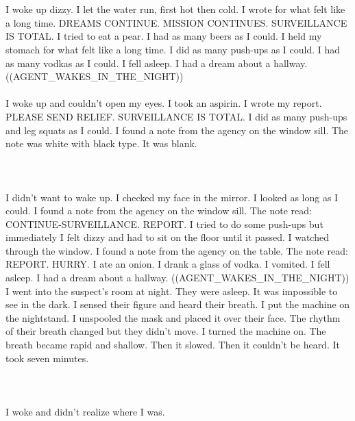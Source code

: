 \documentclass{article}
\begin{document}
    \section{}
    I woke up dizzy. I let the water run, first hot then cold. I wrote for what felt like a long time. DREAMS CONTINUE. MISSION CONTINUES. SURVEILLANCE IS TOTAL. I tried to eat a pear. I had as many beers as I could. I held my stomach for what felt like a long time. I did as many push-ups as I could. I had as many vodkas as I could. I fell asleep. I had a dream about a hallway. ((AGENT_WAKES_IN_THE_NIGHT)) \\\\I woke up and couldn't open my eyes. I took an aspirin. I wrote my report. PLEASE SEND RELIEF. SURVEILLANCE IS TOTAL. I did as many push-ups and leg squats as I could. I found a note from the agency on the window sill. The note was white with black type. It was blank. \\\\
    \newpage
    
    \section{}
    I didn't want to wake up. I checked my face in the mirror. I looked as long as I could. I found a note from the agency on the window sill. The note read: CONTINUE-SURVEILLANCE. REPORT. I tried to do some push-ups but immediately I felt dizzy and had to sit on the floor until it passed. I watched through the window. I found a note from the agency on the table. The note read: REPORT. HURRY. I ate an onion. I drank a glass of vodka. I vomited. I fell asleep. I had a dream about a hallway. ((AGENT_WAKES_IN_THE_NIGHT)) I went into the suspect's room at night. They were asleep. It was impossible to see in the dark. I sensed their figure and heard their breath. I put the machine on the nightstand. I unspooled the mask and placed it over their face. The rhythm of their breath changed but they didn't move. I turned the machine on. The breath became rapid and shallow. Then it slowed. Then it couldn't be heard. It took seven minutes. \\\\
    \newpage
    
    \section{}
    I woke and didn't realize where I was.\\\\ 
    \newpage
    
\end{document}

